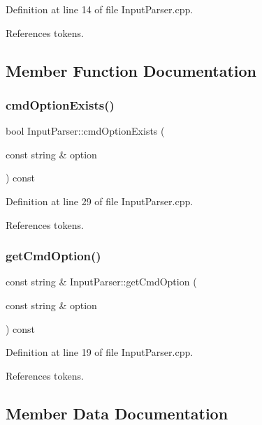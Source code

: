 Definition at line 14 of file Input\+Parser.\+cpp.



References tokens.



\subsection{Member Function Documentation}
\mbox{\label{class_input_parser_ad3d06a9c59e91f425295bdc8408e0544}} 
\subsubsection{cmd\+Option\+Exists()}
{\footnotesize\ttfamily bool Input\+Parser\+::cmd\+Option\+Exists (\begin{DoxyParamCaption}\item[{const string \&}]{option }\end{DoxyParamCaption}) const}



Definition at line 29 of file Input\+Parser.\+cpp.



References tokens.

\mbox{\label{class_input_parser_a494c1de8c06fbb5a88343686e36fbf50}} 
\subsubsection{get\+Cmd\+Option()}
{\footnotesize\ttfamily const string \& Input\+Parser\+::get\+Cmd\+Option (\begin{DoxyParamCaption}\item[{const string \&}]{option }\end{DoxyParamCaption}) const}



Definition at line 19 of file Input\+Parser.\+cpp.



References tokens.



\subsection{Member Data Documentation}
\mbox{\label{class_input_parser_a4bd1105d6fc64bd0e825dc2e34515d75}} 
